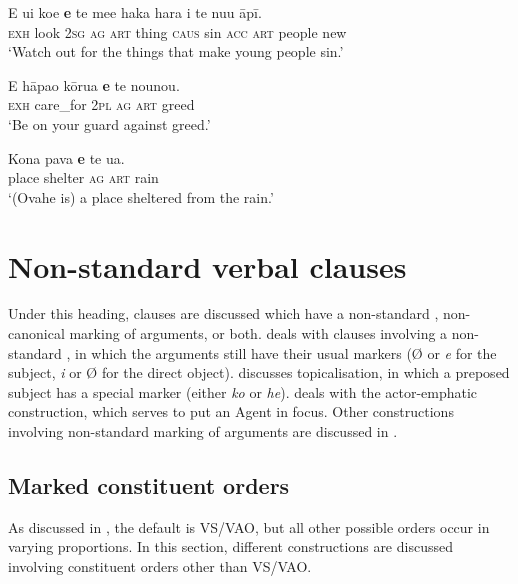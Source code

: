 \ea\label{ex:8.66}
\gll E u{\ꞌ}i koe \textbf{e} te me{\ꞌ}e haka hara i te nu{\ꞌ}u {\ꞌ}āpī. \\
\textsc{exh} look \textsc{2sg} \textsc{ag} \textsc{art} thing \textsc{caus} sin \textsc{acc} \textsc{art} people new \\

\glt 
‘Watch out for the things that make young people sin.’ \textstyleExampleref{[2 Tim. 2:22]}
\z

\ea\label{ex:8.67}
\gll E hāpa{\ꞌ}o kōrua \textbf{e} te nounou. \\
\textsc{exh} care\_for \textsc{2pl} \textsc{ag} \textsc{art} greed \\

\glt 
‘Be on your guard against greed.’ \textstyleExampleref{[Luke 12:15]}
\z

\ea\label{ex:8.68}
\gll Kona pava \textbf{e} te {\ꞌ}ua.\\
place shelter \textsc{ag} \textsc{art} rain\\

\glt 
‘(Ovahe is) a place sheltered from the rain.’ \textstyleExampleref{[R157.024]} 
\z
{}
\section{Non-standard verbal clauses}\label{sec:8.6}

Under this heading, clauses are discussed which have a non-standard , non-canonical marking of arguments, or both.  deals with clauses involving a non-standard , in which the arguments still have their usual markers (Ø or \textit{e} for the subject, \textit{i} or Ø for the direct object).  discusses topicalisation, in which a preposed subject has a special marker (either \textit{ko} or \textit{he}).  deals with the actor-emphatic construction, which serves to put an Agent in focus. Other constructions involving non-standard marking of arguments are discussed in . 

\subsection{Marked constituent orders}\label{sec:8.6.1}

As discussed in , the default  is VS/VAO, but all other possible orders occur in varying proportions. In this section, different constructions are discussed involving constituent orders other than VS/VAO. 

